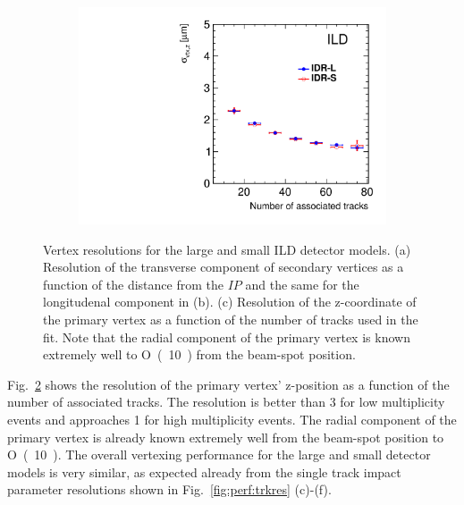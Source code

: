 \begin{figure}[htbp]
\begin{subfigure}{0.49\hsize}
 \caption{  \label{fig:perf:svtx_z}}
 \end{subfigure}
\begin{subfigure}{0.49\hsize}
 \includegraphics[width=\hsize]{Performance/fig/pvtx_z_resol.pdf}
 \caption{  \label{fig:perf:pvtx_z}}
 \end{subfigure}
\caption{ Vertex resolutions for the large and small ILD detector models.
  (a) Resolution of the transverse component of secondary vertices as a function of the distance from the $IP$ and the same for the longitudenal component in (b).
  (c) Resolution of the z-coordinate of the primary vertex as a function of the number of tracks used in the fit. 
  Note that the radial component of the primary vertex is known extremely well to \unit{O(10)}{\nm} from the beam-spot position.
}
\label{fig:perf:vtxres}
\end{figure}
%
Fig.~\ref{fig:perf:pvtx_z} shows the resolution of the primary vertex' z-position as a function of the number of associated tracks.
The resolution is better than \unit{3}{\micron} for low multiplicity events and
approaches \unit{1}{\micron} for high multiplicity events.  The radial component of the primary vertex is already known
extremely well from the beam-spot position to \unit{O(10)}{\nm}. The overall vertexing performance for the large and small detector models
is very similar, as expected already from the single track impact parameter resolutions shown in Fig.~\ref{fig:perf:trkres} (c)-(f).



